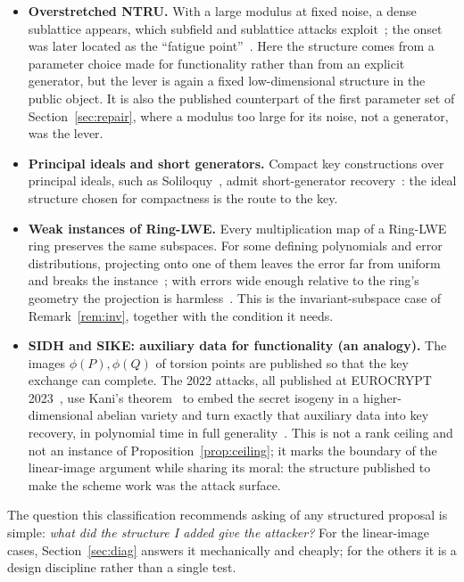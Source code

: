\documentclass[11pt]{article}
\makeatletter
\theoremstyle{remark}
\DeclareRobustCommand{\_}{%
  \edef\@tempa{\ttdefault}%
  \ifx\f@family\@tempa\char95 \else\textunderscore\fi\penalty300\relax}
\makeatother
\begin{document}
\begin{itemize}
  recovery for the second-round SL1 parameters in about a weekend on a laptop~\cite{Beu22}, both exploit the layered
  structure.
\item \textbf{Overstretched NTRU.} With a large modulus at fixed noise, a dense sublattice appears, which subfield and
  sublattice attacks exploit~\cite{ABD16,KF17}; the onset was later located as the ``fatigue point''~\cite{DvW21}. Here
  the structure comes from a parameter choice made for functionality rather than from an explicit generator, but the
  lever is again a fixed low-dimensional structure in the public object. It is also the published counterpart of the
  first parameter set of Section~\ref{sec:repair}, where a modulus too large for its noise, not a generator, was the
  lever.
\item \textbf{Principal ideals and short generators.} Compact key constructions over principal ideals, such as
  Soliloquy~\cite{CGS14}, admit short-generator recovery~\cite{CDPR16}: the ideal structure chosen for compactness is
  the route to the key.
\item \textbf{Weak instances of Ring-LWE.} Every multiplication map of a Ring-LWE ring preserves the same subspaces. For
  some defining polynomials and error distributions, projecting onto one of them leaves the error far from uniform and
  breaks the instance~\cite{ELOS15,CIV16}; with errors wide enough relative to the ring's geometry the projection is
  harmless~\cite{Pei16}. This is the invariant-subspace case of Remark~\ref{rem:inv}, together with the condition it
  needs.
\item \textbf{SIDH and SIKE: auxiliary data for functionality (an analogy).} The images $\phi(P),\phi(Q)$ of torsion
  points are published so that the key exchange can complete. The 2022 attacks, all published at EUROCRYPT
  2023~\cite{CD23,MMPPW23,Rob23}, use Kani's theorem~\cite{Kani97} to embed the secret isogeny in a higher-dimensional
  abelian variety and turn exactly that auxiliary data into key recovery, in polynomial time in full
  generality~\cite{Rob23}. This is not a rank ceiling and not an instance of Proposition~\ref{prop:ceiling}; it marks
  the boundary of the linear-image argument while sharing its moral: the structure published to make the scheme work
  was the attack surface.
\end{itemize}
The question this classification recommends asking of any structured proposal is simple: \emph{what did the structure I
added give the attacker?} For the linear-image cases, Section~\ref{sec:diag} answers it mechanically and cheaply; for the
others it is a design discipline rather than a single test.
\end{document}
